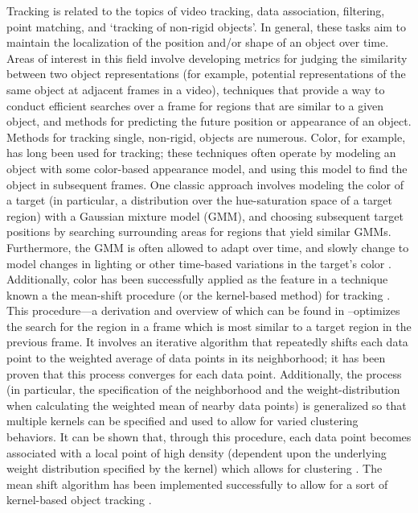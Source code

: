 \documentclass[smallcondensed, final]{svjour3}
\begin{document}
Tracking is related to the topics of video tracking, data association, filtering, point matching, and `tracking of non-rigid objects'. In general, these tasks aim to maintain the localization of the position and/or shape of an object over time. Areas of interest in this field involve developing metrics for judging the similarity between two object representations (for example, potential representations of the same object at adjacent frames in a video), techniques that provide a way to conduct efficient searches over a frame for regions that are similar to a given object, and methods for predicting the future position or appearance of an object. Methods for tracking single, non-rigid, objects are numerous. Color, for example, has long been used for tracking; these techniques often operate by modeling an object with some color-based appearance model, and using this model to find the object in subsequent frames. One classic approach involves modeling the color of a target (in particular, a distribution over the hue-saturation space of a target region) with a Gaussian mixture model (GMM), and choosing subsequent target positions by searching surrounding areas for regions that yield similar GMMs. Furthermore, the GMM is often allowed to adapt over time, and slowly change to model changes in lighting or other time-based variations in the target's color \citep{raja_1998, mckenna_1999, jepson_2003}. Additionally, color has been successfully applied as the feature in a technique known a the mean-shift procedure (or the kernel-based method) for tracking \citep{comaniciu_2003, perez_2002, nummiaro_2003, lee_2011}. This procedure---a derivation and overview of which can be found in \citep{fukunaga_1975, cheng_1995}--optimizes the search for the region in a frame which is most similar to a target region in the previous frame. It involves an iterative algorithm that repeatedly shifts each data point to the weighted average of data points in its neighborhood; it has been proven that this process converges for each data point. Additionally, the process (in particular, the specification of the neighborhood and the weight-distribution when calculating the weighted mean of nearby data points) is generalized so that multiple kernels can be specified and used to allow for varied clustering behaviors. It can be shown that, through this procedure, each data point becomes associated with a local point of high density (dependent upon the underlying weight distribution specified by the kernel) which allows for clustering \citep{cheng_1995}. The mean shift algorithm has been implemented successfully to allow for a sort of kernel-based object tracking \citep{comaniciu_2003, comaniciu_1999, comaniciu_2000}.
\end{document}
